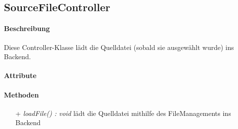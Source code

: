 \subsection{SourceFileController}

\paragraph{Beschreibung}
Diese Controller-Klasse lädt die Quelldatei (sobald sie ausgewählt wurde) ins Backend.


\paragraph{Attribute}

\paragraph{Methoden}
\begin{itemize}
\item[+] \textit{ loadFile() : void}
 lädt die Quelldatei mithilfe des FileManagements ins Backend  
\end{itemize}